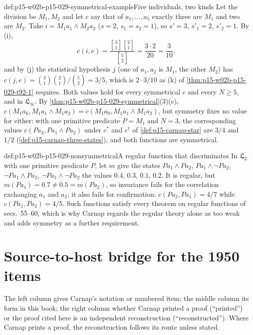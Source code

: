 \begin{hbexample}{def:p15-w02b-p15-029-symmetrical-example}{Five individuals, two kinds}
Let the division be \(M_1,M_2\) and let \(e\) say that of
\(a_1,\ldots,a_5\) exactly three are \(M_1\) and two are \(M_2\). Take
\(i=M_1a_1\land M_2a_2\) (\(s=2\), \(s_1=s_2=1\)), so \(s'=3\),
\(s'_1=2\), \(s'_2=1\). By (i),
\[
 c(i,e)=\frac{\genfrac{[}{]}{0pt}{}{3}{1}\genfrac{[}{]}{0pt}{}{2}{1}}{\genfrac{[}{]}{0pt}{}{5}{2}}
 =\frac{3\cdot2}{20}=\frac3{10},
\]
and by (j) the statistical hypothesis \(j\) (one of \(a_1,a_2\) is
\(M_1\), the other \(M_2\)) has \(c(j,e)=\binom31\binom21/\binom52=3/5\),
which is \(2\cdot3/10\) as (k) of \cref{thm:p15-w02b-p15-029-t92-1}
requires. Both values hold for every symmetrical \(c\) and every
\(N\geq5\), and in \(\mathfrak L_\infty\). By
\cref{thm:p15-w02b-p15-029-symmetrical}(3)(c),
\(c(M_1a_6,M_1a_1\land M_1a_2)=c(M_1a_9,M_1a_1\land M_1a_2)\), but
symmetry fixes no value for either: with one primitive predicate
\(P=M_1\) and \(N=3\), the corresponding values
\(c(Pa_3,Pa_1\land Pa_2)\) under \(c^*\) and \(c^\dagger\) of
\cref{def:p15-carnap-star} are \(3/4\) and \(1/2\)
(\cref{def:p15-carnap-three-states}), and both functions are
symmetrical.
\end{hbexample}

\begin{hbwarning}{def:p15-w02b-p15-029-nonsymmetrical}{A regular function that discriminates}
In \(\mathfrak L_2\) with one primitive predicate \(P\), let \(m\) give
the states \(Pa_1\land Pa_2\), \(Pa_1\land\neg Pa_2\),
\(\neg Pa_1\land Pa_2\), \(\neg Pa_1\land\neg Pa_2\) the values
\(0.4\), \(0.3\), \(0.1\), \(0.2\). It is regular, but
\(m(Pa_1)=0.7\ne0.5=m(Pa_2)\), so invariance fails for the correlation
exchanging \(a_1\) and \(a_2\); it also fails for confirmation:
\(c(Pa_2,Pa_1)=4/7\) while \(c(Pa_1,Pa_2)=4/5\). Such functions satisfy
every theorem on regular functions of secs.~55--60, which is why Carnap
regards the regular theory alone as too weak and adds symmetry as a
further requirement.
\end{hbwarning}

\section{Source-to-host bridge for the 1950 items}
\label{sec:p15-w02b-p15-029-bridge}

The left column gives Carnap's notation or numbered item; the middle
column its form in this book; the right column whether Carnap printed a
proof (``printed'') or the proof cited here is an independent
reconstruction (``reconstructed''). Where Carnap prints a proof, the
reconstruction follows its route unless stated.


